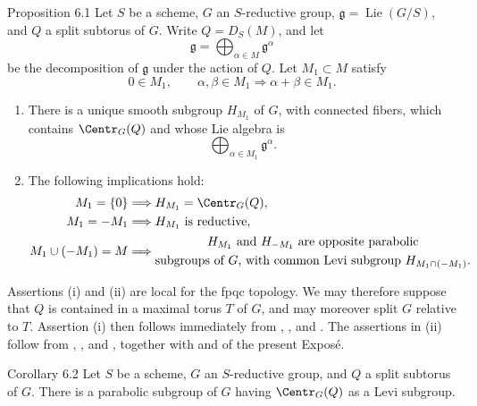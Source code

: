 \begin{sgastatement}{Proposition 6.1}
Let \(S\) be a scheme, \(G\) an \(S\)-reductive group,
\(\mathfrak g=\operatorname{Lie}(G/S)\), and \(Q\) a split subtorus
of \(G\).  Write \(Q=D_S(M)\), and let
\[
 \mathfrak g=\bigoplus_{\alpha\in M}\mathfrak g^\alpha
\]
be the decomposition of \(\mathfrak g\) under the action of \(Q\).
Let \(M_1\subset M\) satisfy
\[
 0\in M_1,\qquad
 \alpha,\beta\in M_1\Longrightarrow\alpha+\beta\in M_1.
\]
\begin{enumerate}[label=\textup{(\roman*)}]
\item There is a unique smooth subgroup \(H_{M_1}\) of \(G\), with
connected fibers, which contains \(\Centr_G(Q)\) and whose Lie
algebra is
\[
 \bigoplus_{\alpha\in M_1}\mathfrak g^\alpha.
\]
\item The following implications hold:
\[
\begin{aligned}
 M_1=\{0\}
   &\Longrightarrow H_{M_1}=\Centr_G(Q),\\
 M_1=-M_1
   &\Longrightarrow H_{M_1}\text{ is reductive},\\
 M_1\cup(-M_1)=M
   &\Longrightarrow
   \begin{gathered}
    H_{M_1}\text{ and }H_{-M_1}\text{ are opposite parabolic}\\
    \text{subgroups of \(G\), with common Levi subgroup }
    H_{M_1\cap(-M_1)}.
   \end{gathered}
\end{aligned}
\]
\end{enumerate}
\end{sgastatement}

Assertions \textup{(i)} and \textup{(ii)} are local for the fpqc
topology.  We may therefore suppose that \(Q\) is contained in a
maximal torus \(T\) of \(G\), and may moreover split \(G\) relative
to \(T\).  Assertion \textup{(i)} then follows immediately from
, , and .  The assertions in
\textup{(ii)} follow from , , and ,
together with  and  of the present Exposé.

\begin{sgastatement}{Corollary 6.2}
Let \(S\) be a scheme, \(G\) an \(S\)-reductive group, and \(Q\) a
split subtorus of \(G\).  There is a parabolic subgroup of \(G\)
having \(\Centr_G(Q)\) as a Levi subgroup.
\end{sgastatement}

